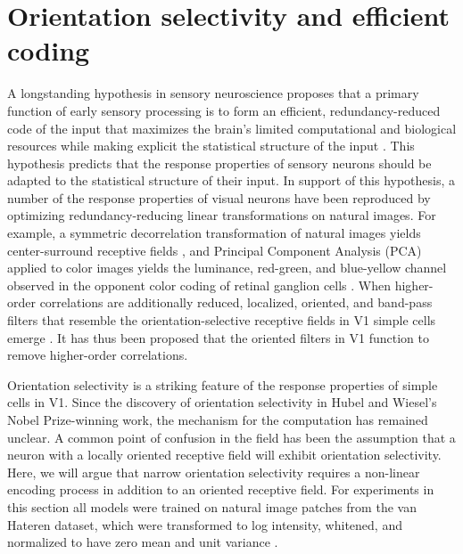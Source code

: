 \section{Orientation selectivity and efficient coding}\label{sec:ch4_selectivity_efficiency}
A longstanding hypothesis in sensory neuroscience proposes that a primary function of early sensory processing is to form an efficient, redundancy-reduced code of the input that maximizes the brain's limited computational and biological resources while making explicit the statistical structure of the input \parencite{barlow2001redundancy}.
This hypothesis predicts that the response properties of sensory neurons should be adapted to the statistical structure of their input.
In support of this hypothesis, a number of the response properties of visual neurons have been reproduced by optimizing redundancy-reducing linear transformations on natural images.
For example, a symmetric decorrelation transformation of natural images yields center-surround receptive fields \parencite{atick1990towards}, and Principal Component Analysis (PCA) applied to color images yields the luminance, red-green, and blue-yellow channel observed in the opponent color coding of retinal ganglion cells \parencite{ruderman1998statistics, buchsbaum1983trichromacy}.
When higher-order correlations are additionally reduced, localized, oriented, and band-pass filters that resemble the orientation-selective receptive fields in V1 simple cells emerge \parencite{bell1997independent, olshausen1997sparse}.
It has thus been proposed that the oriented filters in V1 function to remove higher-order correlations.

Orientation selectivity is a striking feature of the response properties of simple cells in V1.
Since the discovery of orientation selectivity in Hubel and Wiesel's Nobel Prize-winning work, the mechanism for the computation has remained unclear.
A common point of confusion in the field has been the assumption that a neuron with a locally oriented receptive field will exhibit orientation selectivity.
Here, we will argue that narrow orientation selectivity requires a non-linear encoding process in addition to an oriented receptive field.
For experiments in this section all models were trained on natural image patches from the van Hateren dataset, which were transformed to log intensity, whitened, and normalized to have zero mean and unit variance \parencite{hateren1998independent}.

